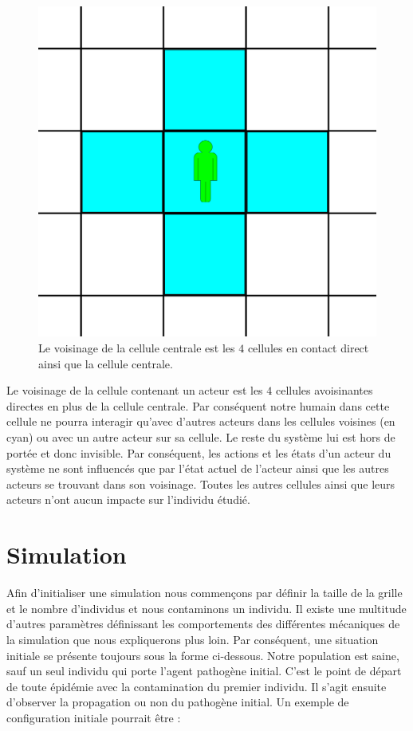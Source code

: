 \begin{figure}[h]
	\centering
	\captionsetup{justification=centering}
	\includegraphics[scale=0.5]{Images/voisinage.png}
	\caption[Voisinage d'une cellule]{Le voisinage de la cellule centrale est les $4$ cellules en contact direct ainsi que la cellule centrale.}
\end{figure}

Le voisinage de la cellule contenant un acteur est les $4$ cellules avoisinantes directes en plus de la cellule centrale. Par conséquent notre humain dans cette cellule ne pourra interagir qu'avec d'autres acteurs dans les cellules voisines (en cyan) ou avec un autre acteur sur sa cellule. Le reste du système lui est hors de portée et donc invisible. Par conséquent, les actions et les états d'un acteur du système ne sont influencés que par l'état actuel de l'acteur ainsi que les autres acteurs se trouvant dans son voisinage. Toutes les autres cellules ainsi que leurs acteurs n'ont aucun impacte sur l'individu étudié.

\section{Simulation}

Afin d'initialiser une simulation nous commençons par définir la taille de la grille et le nombre d'individus et nous contaminons un individu. Il existe une multitude d'autres paramètres définissant les comportements des différentes mécaniques de la simulation que nous expliquerons plus loin. Par conséquent, une situation initiale se présente toujours sous la forme ci-dessous. Notre population est saine, sauf un seul individu qui porte l'agent pathogène initial. C'est le point de départ de toute épidémie avec la contamination du premier individu. Il s'agit ensuite d'observer la propagation ou non du pathogène initial. Un exemple de configuration initiale pourrait être : \\

